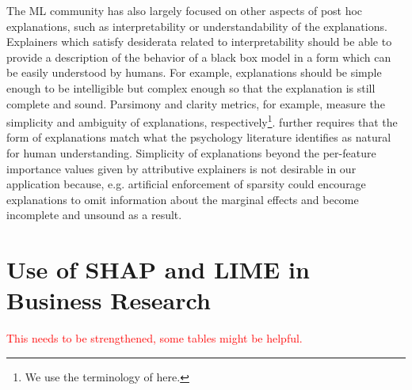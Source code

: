 \documentclass[mnsc,blindrev]{informs3}
\begin{document}
  The ML community has also largely focused on other aspects of post hoc explanations, such as interpretability or understandability of the explanations. Explainers which satisfy desiderata related to interpretability should be able to provide a description of the behavior of a black box model in a form which can be easily understood by humans. For example, explanations should be simple enough to be intelligible but complex enough so that the explanation is still complete and sound. Parsimony \citep{nguyen2020quantitative} and clarity \citep{lakkaraju2017interpretable,montavon2018methods,alvarez18robustness} metrics, for example, measure the simplicity and ambiguity of explanations, respectively\footnote{We use the terminology of \cite{markus2021role} here.}. \cite{jacovi2023diagnosing} further requires that the form of explanations match what the psychology literature identifies as natural for human understanding.  Simplicity of explanations beyond the per-feature importance values given by attributive explainers is not desirable in our application because, e.g. artificial enforcement of sparsity could encourage explanations to omit information about the marginal effects and become incomplete and unsound as a result. %

    
   
    
    
    \section{Use of SHAP and LIME in Business Research}
        \label{sec:use_in_b_research}
\textcolor{red}{This needs to be strengthened, some tables might be helpful. }
\end{document}
